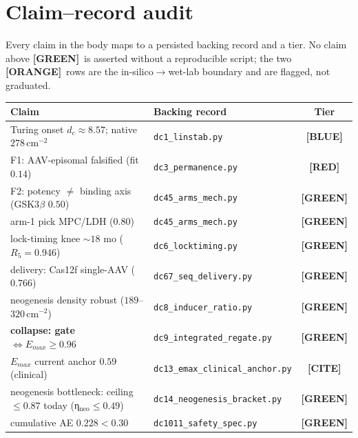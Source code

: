 \documentclass[11pt,a4paper]{article}
\newcommand{\tierbadge}[2]{\textcolor{#1}{\textbf{[#2]}}}
\providecommand{\tierBlue}{\tierbadge{blue!60!black}{BLUE}}
\providecommand{\tierGreen}{\tierbadge{green!45!black}{GREEN}}
\providecommand{\tierYellow}{\tierbadge{yellow!50!black}{CITE}}
\providecommand{\tierOrange}{\tierbadge{orange!80!black}{ORANGE}}
\providecommand{\tierRed}{\tierbadge{red!75!black}{RED}}
\begin{document}
\appendix
\section{Claim--record audit}
\label{app:audit}

Every claim in the body maps to a persisted backing record and a tier. No claim
above \tierGreen\ is asserted without a reproducible script; the two \tierOrange\
rows are the in-silico$\to$wet-lab boundary and are flagged, not graduated.

\begin{table}[h]
\centering\small
\begin{tabular}{@{}>{\raggedright\arraybackslash}m{6.6cm} >{\raggedright\arraybackslash}m{4.4cm} c@{}}
\toprule
\textbf{Claim} & \textbf{Backing record} & \textbf{Tier} \\
\midrule
Turing onset $d_c\approx 8.57$; native $278$\,cm$^{-2}$         & \texttt{dc1\_linstab.py}        & \tierBlue \\
F1: AAV-episomal falsified (fit $0.14$)                         & \texttt{dc3\_permanence.py}     & \tierRed \\
F2: potency $\neq$ binding axis (GSK3$\beta$ $0.50$)            & \texttt{dc45\_arms\_mech.py}    & \tierGreen \\
arm-1 pick MPC/LDH ($0.80$)                                     & \texttt{dc45\_arms\_mech.py}    & \tierGreen \\
lock-timing knee ${\sim}18$ mo ($R_5=0.946$)                   & \texttt{dc6\_locktiming.py}     & \tierGreen \\
delivery: Cas12f single-AAV ($0.766$)                          & \texttt{dc67\_seq\_delivery.py} & \tierGreen \\
neogenesis density robust ($189$--$320$\,cm$^{-2}$)            & \texttt{dc8\_inducer\_ratio.py} & \tierGreen \\
\textbf{collapse: gate $\Leftrightarrow E_{max}\geq 0.96$}      & \texttt{dc9\_integrated\_regate.py} & \tierGreen \\
$E_{max}$ current anchor $0.59$ (clinical)                      & \texttt{dc13\_emax\_clinical\_anchor.py} & \tierYellow \\
neogenesis bottleneck: ceiling $\leq 0.87$ today (η$_{\text{neo}}{\leq}0.49$) & \texttt{dc14\_neogenesis\_bracket.py} & \tierGreen \\
cumulative AE $0.228<0.30$                                      & \texttt{dc1011\_safety\_spec.py}& \tierGreen \\

\end{tabular}
\end{table}
\end{document}
